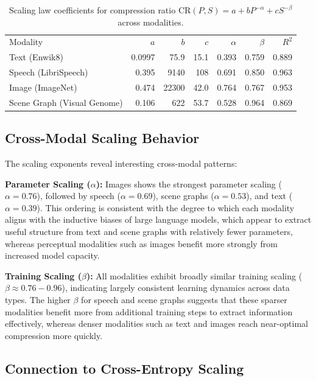 \documentclass[10pt]{article} %
\begin{document}
\begin{table}[h]
\centering
\begin{tabular}{l r r r r r r}
Modality & $a$ & $b$ & $c$ & $\alpha$ & $\beta$ & $R^2$\\
Text (Enwik8) & 0.0997 & 75.9 & 15.1 & 0.393 & 0.759 & 0.889\\
Speech (LibriSpeech) & 0.395 & 9140 & 108 & 0.691 & 0.850 & 0.963 \\
Image (ImageNet) & 0.474 & 22300 & 42.0 & 0.764 & 0.767 & 0.953 \\
Scene Graph (Visual Genome) & 0.106 & 622 & 53.7 & 0.528 & 0.964 & 0.869\\
\end{tabular}
\caption{Scaling law coefficients for compression ratio $\mathrm{CR}(P,S) = a + bP^{-\alpha} + cS^{-\beta}$ across modalities.}
\label{tab:scaling_coefficients}
\end{table}

\subsection{Cross-Modal Scaling Behavior}

The scaling exponents reveal interesting cross-modal patterns:

\textbf{Parameter Scaling ($\alpha$):} Images shows the strongest parameter scaling ($\alpha = 0.76$), followed by speech ($\alpha = 0.69$), scene graphs ($\alpha = 0.53$), and text ($\alpha = 0.39$). This ordering is consistent with the degree to which each modality aligns with the inductive biases of large language models, which appear to extract useful structure from text and scene graphs with relatively fewer parameters, whereas perceptual modalities such as images benefit more strongly from increased model capacity.

\textbf{Training Scaling ($\beta$):} All modalities exhibit broadly similar training scaling ($\beta \approx 0.76-0.96$), indicating largely consistent learning dynamics across data types. The higher $\beta$ for speech and scene graphs suggests that these sparser modalities benefit more from additional training steps to extract information effectively, whereas denser modalities such as text and images reach near-optimal compression more quickly.

\subsection{Connection to Cross-Entropy Scaling}
\end{document}
